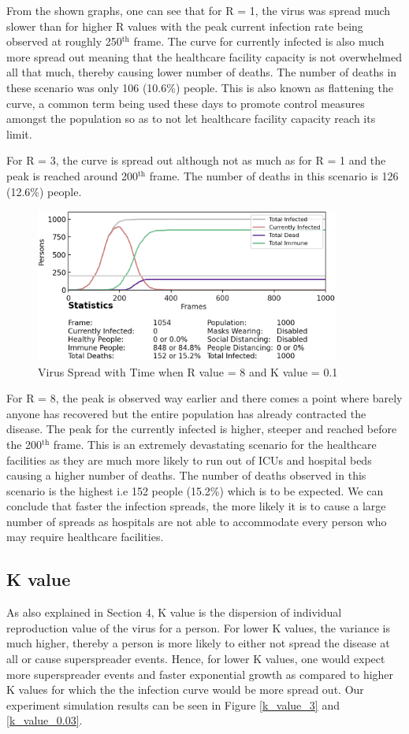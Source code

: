 \documentclass[11pt]{article}
\begin{document}
From the shown graphs, one can see that for R = 1, the virus was spread much slower than for higher R values with the peak current infection rate being observed at roughly 250$^\text{th}$ frame. The curve for currently infected is also much more spread out meaning that the healthcare facility capacity is not overwhelmed all that much, thereby causing lower number of deaths. The number of deaths in these scenario was only 106 (10.6\%) people. This is also known as flattening the curve, a common term being used these days to promote control measures amongst the population so as to not let healthcare facility capacity reach its limit. 

For R = 3, the curve is spread out although not as much as for R = 1 and the peak is reached around 200$^\text{th}$ frame. The number of deaths in this scenario is 126 (12.6\%) people.

\begin{figure}[H]
    \centering
    \includegraphics[width=10cm]{figures/r_value_comparison8.png}
    \caption{Virus Spread with Time when R value = 8 and K value = 0.1}
    \label{r_value_8}
\end{figure}

For R = 8, the peak is observed way earlier and there comes a point where barely anyone has recovered but the entire population has already contracted the disease. The peak for the currently infected is higher, steeper and reached before the 200$^\text{th}$ frame. This is an extremely devastating scenario for the healthcare facilities as they are much more likely to run out of ICUs and hospital beds causing a higher number of deaths. The number of deaths observed in this scenario is the highest i.e 152 people (15.2\%) which is to be expected. We can conclude that faster the infection spreads, the more likely it is to cause a large number of spreads as hospitals are not able to accommodate every person who may require healthcare facilities. 

\subsection{K value}
As also explained in Section 4, K value is the dispersion of individual reproduction value of the virus for a person. For lower K values, the variance is much higher, thereby a person is more likely to either not spread the disease at all or cause superspreader events. Hence, for lower K values, one would expect more superspreader events and faster exponential growth as compared to higher K values for which the the infection curve would be more spread out. Our experiment simulation results can be seen in Figure \ref{k_value_3} and \ref{k_value_0.03}.
\end{document}
